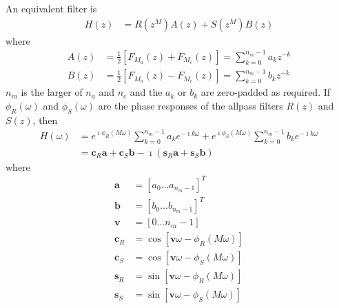 \documentclass[a4paper,twoside,10pt,english]{report}
\begin{document}
An equivalent filter is
\begin{align*}
H\left(z\right)&=R\left(z^{M}\right)A\left(z\right)+
                 S\left(z^{M}\right)B\left(z\right)
\end{align*}
where
\begin{align*}
A\left(z\right)&=
\frac{1}{2}\left[F_{M_{a}}\left(z\right)+F_{M_{c}}\left(z\right)\right] 
= \sum_{k=0}^{n_{m}-1}a_{k}z^{-k}\\
B\left(z\right)&=
\frac{1}{2}\left[F_{M_{a}}\left(z\right)-F_{M_{c}}\left(z\right)\right] 
=\sum_{k=0}^{n_{m}-1}b_{k}z^{-k}
\end{align*}
$n_{m}$ is the larger of $n_{a}$ and $n_{c}$ and the $a_{k}$ or $b_{k}$ are
zero-padded as required. If $\phi_{R}\left(\omega\right)$ and
$\phi_{S}\left(\omega\right)$ are the phase responses of the allpass filters 
$R\left(z\right)$ and $S\left(z\right)$, then 
\begin{align*}
H\left(\omega\right)&=
e^{\imath\phi_{R}\left(M\omega\right)}
\sum_{k=0}^{n_{m}-1}a_{k}e^{-\imath k\omega}+
e^{\imath\phi_{S}\left(M\omega\right)}
\sum_{k=0}^{n_{m}-1}b_{k}e^{-\imath k\omega}\\
&=\boldsymbol{c}_{R}\boldsymbol{a}+\boldsymbol{c}_{S}\boldsymbol{b}
-\imath\left(\boldsymbol{s}_{R}\boldsymbol{a}+
             \boldsymbol{s}_{S}\boldsymbol{b}\right)
\end{align*}
where
\begin{align*}
\boldsymbol{a}&=\left[a_{0} ... a_{n_{m}-1}\right]^{T}\\
\boldsymbol{b}&=\left[b_{0} ... b_{n_{m}-1}\right]^{T}\\
\boldsymbol{v}&=\left[0 ... n_{m}-1\right]\\
\boldsymbol{c}_{R}&=\cos\left[ \boldsymbol{v}\omega - 
                               \phi_{R}\left(M\omega\right)\right]\\
\boldsymbol{c}_{S}&=\cos\left[ \boldsymbol{v}\omega - 
                               \phi_{S}\left(M\omega\right)\right]\\
\boldsymbol{s}_{R}&=\sin\left[ \boldsymbol{v}\omega - 
                               \phi_{R}\left(M\omega\right)\right]\\
\boldsymbol{s}_{S}&=\sin\left[ \boldsymbol{v}\omega - 
                               \phi_{S}\left(M\omega\right)\right]
\end{align*}
\end{document}
